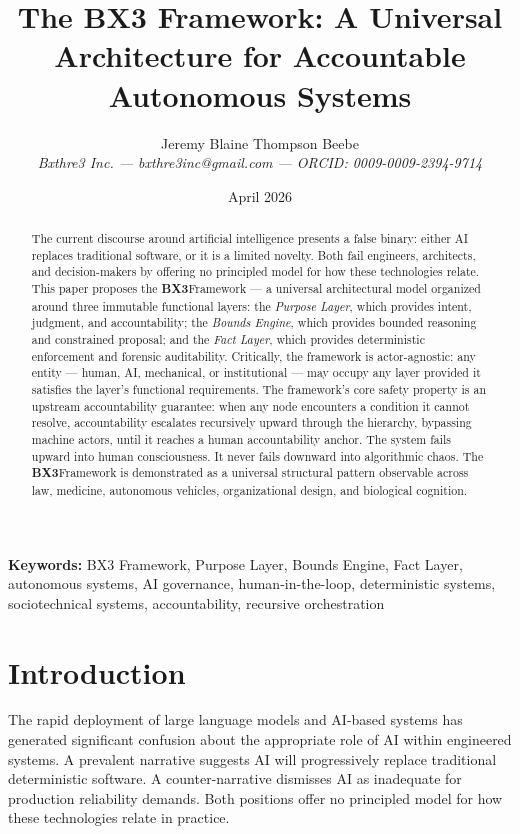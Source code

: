 \documentclass[12pt]{article}
\title{The BX3 Framework: A Universal Architecture for Accountable Autonomous Systems}
\author{Jeremy Blaine Thompson Beebe\\[0.2em]\textit{Bxthre3 Inc. --- bxthre3inc@gmail.com --- ORCID: 0009-0009-2394-9714}}
\date{April 2026}
\newcommand{\bxthree}{\textbf{BX3}}
\newcommand{\purpose}{\textit{Purpose Layer}}
\newcommand{\bounds}{\textit{Bounds Engine}}
\newcommand{\fact}{\textit{Fact Layer}}
\begin{document}
\maketitle

\begin{abstract}
\noindent
The current discourse around artificial intelligence presents a false binary: either AI replaces traditional software, or it is a limited novelty. Both fail engineers, architects, and decision-makers by offering no principled model for how these technologies relate. This paper proposes the \bxthree Framework --- a universal architectural model organized around three immutable functional layers: the \purpose, which provides intent, judgment, and accountability; the \bounds, which provides bounded reasoning and constrained proposal; and the \fact, which provides deterministic enforcement and forensic auditability. Critically, the framework is actor-agnostic: any entity --- human, AI, mechanical, or institutional --- may occupy any layer provided it satisfies the layer's functional requirements. The framework's core safety property is an upstream accountability guarantee: when any node encounters a condition it cannot resolve, accountability escalates recursively upward through the hierarchy, bypassing machine actors, until it reaches a human accountability anchor. The system fails upward into human consciousness. It never fails downward into algorithmic chaos. The \bxthree Framework is demonstrated as a universal structural pattern observable across law, medicine, autonomous vehicles, organizational design, and biological cognition.
\end{abstract}

\medskip
\noindent\textbf{Keywords:} BX3 Framework, Purpose Layer, Bounds Engine, Fact Layer, autonomous systems, AI governance, human-in-the-loop, deterministic systems, sociotechnical systems, accountability, recursive orchestration

\newpage

\section{Introduction}
\label{sec:intro}

The rapid deployment of large language models and AI-based systems has generated significant confusion about the appropriate role of AI within engineered systems. A prevalent narrative suggests AI will progressively replace traditional deterministic software. A counter-narrative dismisses AI as inadequate for production reliability demands. Both positions offer no principled model for how these technologies relate in practice.
\end{document}
